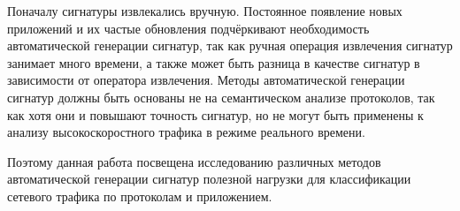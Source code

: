 Поначалу сигнатуры извлекались вручную. Постоянное появление новых приложений и их частые обновления подчёркивают необходимость автоматической генерации сигнатур,
так как ручная операция извлечения сигнатур занимает много времени, а также может быть разница в качестве сигнатур в зависимости от оператора извлечения.
Методы автоматической генерации сигнатур должны быть основаны не на семантическом анализе протоколов, так как хотя они и повышают точность сигнатур,
но не могут быть применены к анализу высокоскоростного трафика в режиме реального времени.

Поэтому данная работа посвещена исследованию различных методов автоматической генерации сигнатур полезной нагрузки для классификации сетевого трафика по протоколам и приложением.

\newpage
